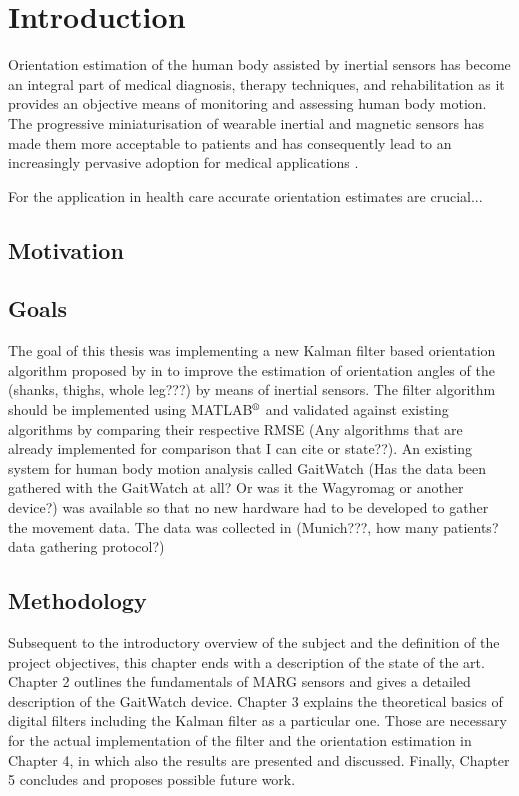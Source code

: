 \chapter{Introduction}
\label{ch:Introduction}

Orientation estimation of the human body assisted by inertial sensors has become an integral part of medical diagnosis, therapy techniques, and rehabilitation as it provides an objective means of monitoring and assessing human body motion. The progressive miniaturisation of wearable inertial and magnetic sensors has made them more acceptable to patients and has consequently lead to an increasingly pervasive adoption for medical applications \cite{wee_soon_ambulatory_2008}.

For the application in health care accurate orientation estimates are crucial...

\section{Motivation}


\section{Goals}

The goal of this thesis was implementing a new Kalman filter based orientation algorithm proposed by \citeauthor{bennett_motion_2014} in \cite{bennett_motion_2014} to improve the estimation of orientation angles of the (shanks, thighs, whole leg???) by means of inertial sensors. The filter algorithm should be implemented using MATLAB$\textsuperscript{\textregistered}$ and validated against existing algorithms by comparing their respective \gls{RMSE} (Any algorithms that are already implemented for comparison that I can cite or state??). An existing system for human body motion analysis called GaitWatch (Has the data been gathered with the GaitWatch at all? Or was it the Wagyromag or another device?) was available so that no new hardware had to be developed to gather the movement data. The data was collected in (Munich???, how many patients? data gathering protocol?)

\section{Methodology}

Subsequent to the introductory overview of the subject and the definition of the project objectives, this chapter ends with a description of the state of the art. Chapter 2 outlines the fundamentals of MARG sensors and gives a detailed description of the GaitWatch device. Chapter 3 explains the theoretical basics of digital filters including the Kalman filter as a particular one. Those are necessary for the actual implementation of the filter and the orientation estimation in Chapter 4, in which also the results are presented and discussed. Finally, Chapter 5 concludes and proposes possible future work.

